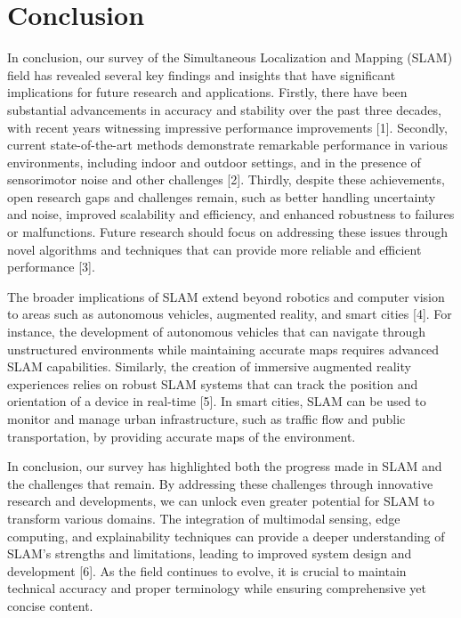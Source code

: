 \documentclass[conference]{IEEEtran}
\begin{document}
\section{Conclusion}
In conclusion, our survey of the Simultaneous Localization and Mapping (SLAM) field has revealed several key findings and insights that have significant implications for future research and applications. Firstly, there have been substantial advancements in accuracy and stability over the past three decades, with recent years witnessing impressive performance improvements [1]. Secondly, current state-of-the-art methods demonstrate remarkable performance in various environments, including indoor and outdoor settings, and in the presence of sensorimotor noise and other challenges [2]. Thirdly, despite these achievements, open research gaps and challenges remain, such as better handling uncertainty and noise, improved scalability and efficiency, and enhanced robustness to failures or malfunctions. Future research should focus on addressing these issues through novel algorithms and techniques that can provide more reliable and efficient performance [3].

The broader implications of SLAM extend beyond robotics and computer vision to areas such as autonomous vehicles, augmented reality, and smart cities [4]. For instance, the development of autonomous vehicles that can navigate through unstructured environments while maintaining accurate maps requires advanced SLAM capabilities. Similarly, the creation of immersive augmented reality experiences relies on robust SLAM systems that can track the position and orientation of a device in real-time [5]. In smart cities, SLAM can be used to monitor and manage urban infrastructure, such as traffic flow and public transportation, by providing accurate maps of the environment.

In conclusion, our survey has highlighted both the progress made in SLAM and the challenges that remain. By addressing these challenges through innovative research and developments, we can unlock even greater potential for SLAM to transform various domains. The integration of multimodal sensing, edge computing, and explainability techniques can provide a deeper understanding of SLAM's strengths and limitations, leading to improved system design and development [6]. As the field continues to evolve, it is crucial to maintain technical accuracy and proper terminology while ensuring comprehensive yet concise content.
\end{document}
